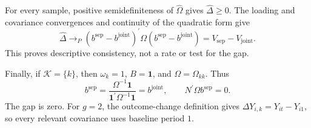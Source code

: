 For every sample, positive semidefiniteness of \(\widehat\Omega\) gives \(\widehat\Delta\ge0\). The loading and covariance convergences and continuity of the quadratic form give
\[
 \widehat\Delta\to_P
 (b^{\mathrm{sep}}-b^{\mathrm{joint}})^{\prime}
 \Omega(b^{\mathrm{sep}}-b^{\mathrm{joint}})
 =V_{\mathrm{sep}}-V_{\mathrm{joint}}.
\]
This proves descriptive consistency, not a rate or test for the gap.

Finally, if \(\mathcal K=\{k\}\), then \(\omega_k=1\), \(B=\mathbf 1\), and \(\Omega=\Omega_{kk}\). Thus
\[
 b^{\mathrm{sep}}
 =\frac{\Omega^{-1}\mathbf 1}
 {\mathbf 1^{\prime}\Omega^{-1}\mathbf 1}
 =b^{\mathrm{joint}},
 \qquad
 N^{\prime}\Omega b^{\mathrm{sep}}=0.
\]
The gap is zero. For \(g=2\), the outcome-change definition gives \(\Delta Y_{i,k}=Y_{it}-Y_{i1}\), so every relevant covariance uses baseline period \(1\).